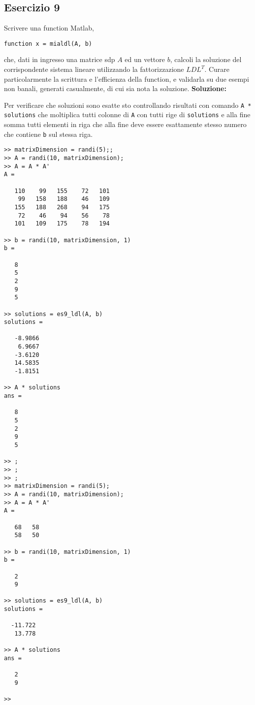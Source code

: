 \subsection{Esercizio 9}
Scrivere una function Matlab,
\begin{lstlisting}
function x = mialdl(A, b)
\end{lstlisting}
che, dati in ingresso una matrice sdp $A$ ed un vettore $b$, calcoli la soluzione
del corrispondente sistema lineare utilizzando la fattorizzazione $LDL^T$.
Curare particolarmente la scrittura e l'efficienza della function,
e validarla su due esempi non banali, generati casualmente, di cui sia nota la soluzione.
\newline \textbf{Soluzione:}


Per verificare che soluzioni sono esatte sto controllando risultati con comando \lstinline{A * solutions}
che moltiplica tutti colonne di \lstinline{A} con tutti rige di \lstinline{solutions} e alla fine somma tutti
elementi in riga che alla fine deve essere esattamente stesso numero
che contiene \lstinline{b} sul stessa riga.
\begin{lstlisting}
>> matrixDimension = randi(5);;
>> A = randi(10, matrixDimension);
>> A = A * A'
A =

   110    99   155    72   101
    99   158   188    46   109
   155   188   268    94   175
    72    46    94    56    78
   101   109   175    78   194

>> b = randi(10, matrixDimension, 1)
b =

   8
   5
   2
   9
   5

>> solutions = es9_ldl(A, b)
solutions =

   -8.9866
    6.9667
   -3.6120
   14.5835
   -1.8151

>> A * solutions
ans =

   8
   5
   2
   9
   5

>> ;
>> ;
>> ;
>> matrixDimension = randi(5);
>> A = randi(10, matrixDimension);
>> A = A * A'
A =

   68   58
   58   50

>> b = randi(10, matrixDimension, 1)
b =

   2
   9

>> solutions = es9_ldl(A, b)
solutions =

  -11.722
   13.778

>> A * solutions
ans =

   2
   9

>>
\end{lstlisting}
